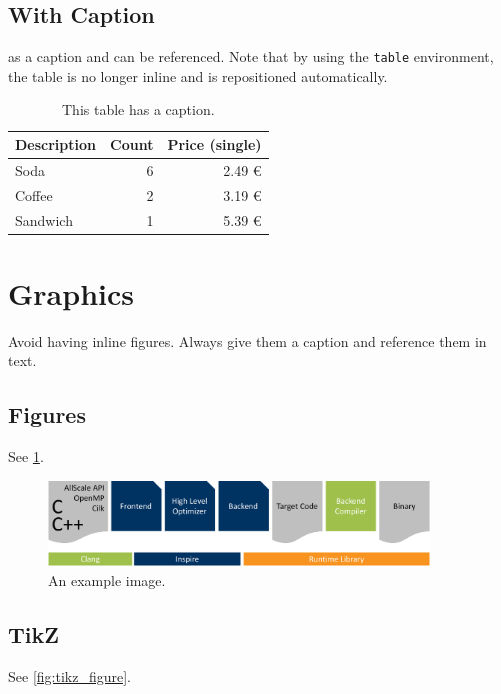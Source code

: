 \documentclass[parskip=half]{scrbook}
\begin{document}
\subsection{With Caption}

 as a caption and can be referenced.
Note that by using the \texttt{table} environment, the table is no longer inline and is repositioned automatically.

\begin{table}
	\centering
	\begin{tabularx}{0.75\textwidth}{Xrr}
		\toprule
		Description & Count & Price (single)\\
		\midrule
		Soda & 6 & 2.49 €\\
		Coffee & 2 & 3.19 €\\
		Sandwich & 1 & 5.39 €\\
		\bottomrule
	\end{tabularx}
	\caption{This table has a caption.}
	\label{tbl:some_table}
\end{table}

\section{Graphics}

Avoid having inline figures.
Always give them a caption and reference them in text.

\subsection{Figures}

See \cref{fig:some_figure}.

\begin{figure}
	\centering
	\includegraphics[width=0.9\textwidth]{images/example.pdf}
	\caption{An example image.}
	\label{fig:some_figure}
\end{figure}

\subsection{TikZ}

See \cref{fig:tikz_figure}.
\end{document}
